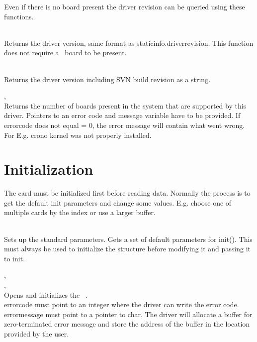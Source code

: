 	Even if there is no board present the driver revision can be queried using these functions.

	\\
	Returns the driver version, same format as \textsf{\prefix static\tu info.driver\tu revision}. 
	This function does not require a \deviceName\ board to be present.

	\\
	Returns the driver version including SVN build revision as a string. 

	, \label{countdevices}\\
    Returns the number of boards present in the system that are supported by this driver.
	Pointers to an error code and message variable have to be provided. If error\tu code does not equal  = 0, the error message will contain what went wrong. For E.g. crono kernel was not properly installed. \par


\section {Initialization}
        The card must be initialized first before reading data. Normally the process is
        to get the default init parameters and change some values. E.g. choose one of
        multiple cards by the index or use a larger buffer.
		

		\\
		Sets up the standard parameters. Gets a set of default parameters for \textsf{\prefix init()}. 
		This must always be used to initialize the \textsf{\initparameters} structure before modifying it 
		and passing it to \textsf{\prefix init}.\par

		, \\ 
		, \\
		Opens and initializes the \deviceName\ 
		. \\
		\textsf{error\tu code} must point to an integer where the driver can write the error code. \\
		\textsf{error\tu message} must point to a pointer to char. 
		The driver will allocate a buffer for zero-terminated error message and store the address of the buffer in the location provided by the user.\par

